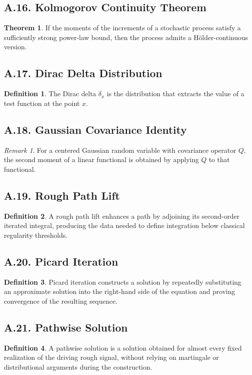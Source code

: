 \documentclass[11pt]{article}
\theoremstyle{definition}
\newtheorem{definition}{Definition}
\newtheorem{theorem}{Theorem}
\theoremstyle{remark}
\newtheorem{remark}{Remark}
\begin{document}
\subsection*{A.16. Kolmogorov Continuity Theorem}
\begin{theorem}
If the moments of the increments of a stochastic process satisfy a sufficiently strong power-law bound, then the process admits a Hölder-continuous version.
\end{theorem}

\subsection*{A.17. Dirac Delta Distribution}
\begin{definition}
The Dirac delta \(\delta_x\) is the distribution that extracts the value of a test function at the point \(x\).
\end{definition}

\subsection*{A.18. Gaussian Covariance Identity}
\begin{remark}
For a centered Gaussian random variable with covariance operator \(Q\), the second moment of a linear functional is obtained by applying \(Q\) to that functional.
\end{remark}

\subsection*{A.19. Rough Path Lift}
\begin{definition}
A rough path lift enhances a path by adjoining its second-order iterated integral, producing the data needed to define integration below classical regularity thresholds.
\end{definition}

\subsection*{A.20. Picard Iteration}
\begin{definition}
Picard iteration constructs a solution by repeatedly substituting an approximate solution into the right-hand side of the equation and proving convergence of the resulting sequence.
\end{definition}

\subsection*{A.21. Pathwise Solution}
\begin{definition}
A pathwise solution is a solution obtained for almost every fixed realization of the driving rough signal, without relying on martingale or distributional arguments during the construction.
\end{definition}
\end{document}
